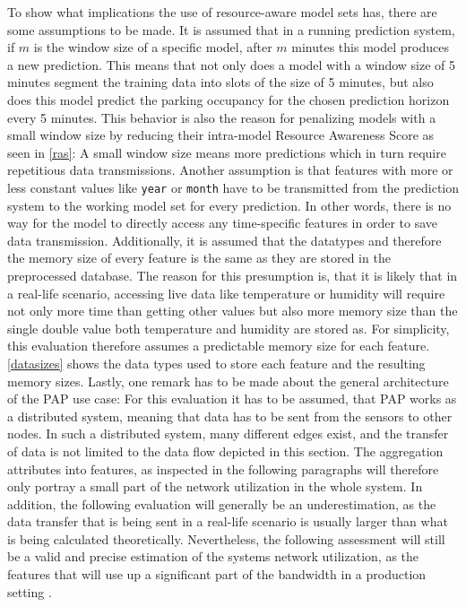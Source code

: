 To show what implications the use of resource-aware model sets has, there are some assumptions to be made. It is assumed that in a running prediction system, if $m$ is the window size of a specific model, after $m$ minutes this model produces a new prediction. This means that not only does a model with a window size of 5 minutes segment the training data into slots of the size of 5 minutes, but also does this model predict the parking occupancy for the chosen prediction horizon every 5 minutes. This behavior is also the reason for penalizing models with a small window size by reducing their intra-model Resource Awareness Score as seen in \autoref{ras}: A small window size means more predictions which in turn require repetitious data transmissions. Another assumption is that features with more or less constant values like \texttt{year} or \texttt{month} have to be transmitted from the prediction system to the working model set for every prediction. In other words, there is no way for the model to directly access any time-specific features in order to save data transmission. Additionally, it is assumed that the datatypes and therefore the memory size of every feature is the same as they are stored in the preprocessed database. The reason for this presumption is, that it is likely that in a real-life scenario, accessing live data like temperature or humidity will require not only more time than getting other values but also more memory size than the single double value both temperature and humidity are stored as. For simplicity, this evaluation therefore assumes a predictable memory size for each feature. \autoref{datasizes} shows the data types used to store each feature and the resulting memory sizes. Lastly, one remark has to be made about the general architecture of the PAP use case: For this evaluation it has to be assumed, that PAP works as a distributed system, meaning that data has to be sent from the sensors to other nodes. In such a distributed system, many different edges exist, and the transfer of data is not limited to the data flow depicted in this section. The aggregation attributes into features, as inspected in the following paragraphs will therefore only portray a small part of the network utilization in the whole system. In addition, the following evaluation will generally be an underestimation, as the data transfer that is being sent in a real-life scenario is usually larger than what is being calculated theoretically. Nevertheless, the following assessment will still be a valid and precise estimation of the systems network utilization, as the features that will use up a significant part of the bandwidth in a production setting \cite{sunkel2022}.


